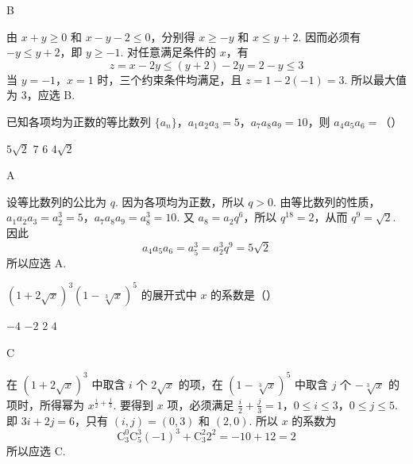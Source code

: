 \begin{answer}
B
\end{answer}

\begin{solution}
由 \(x+y\geqslant0\) 和 \(x-y-2\leqslant0\)，分别得 \(x\geqslant-y\) 和 \(x\leqslant y+2\). 因而必须有 \(-y\leqslant y+2\)，即 \(y\geqslant-1\). 对任意满足条件的 \(x\)，有
\[
z=x-2y\leqslant(y+2)-2y=2-y\leqslant3
\]
当 \(y=-1\)，\(x=1\) 时，三个约束条件均满足，且 \(z=1-2(-1)=3\). 所以最大值为 \(3\)，应选 B.
\end{solution}

\begin{problem}
已知各项均为正数的等比数列 \(\{a_{n}\}\)，\(a_{1}a_{2}a_{3} = 5\)，\(a_{7}a_{8}a_{9} = 10\)，则 \(a_{4}a_{5}a_{6} =\)（\quad）

\choices
    {\(5\sqrt{2}\)}
    {\(7\)}
    {\(6\)}
    {\(4\sqrt{2}\)}
\end{problem}

\begin{answer}
A
\end{answer}

\begin{solution}
设等比数列的公比为 \(q\). 因为各项均为正数，所以 \(q>0\). 由等比数列的性质，
\(a_{1}a_{2}a_{3}=a_{2}^{3}=5\)，\(a_{7}a_{8}a_{9}=a_{8}^{3}=10\).
又 \(a_{8}=a_{2}q^{6}\)，所以 \(q^{18}=2\)，从而 \(q^{9}=\sqrt2\). 因此
\[
a_{4}a_{5}a_{6}=a_{5}^{3}=a_{2}^{3}q^{9}=5\sqrt2
\]
所以应选 A.
\end{solution}

\begin{problem}
\((1 + 2\sqrt{x})^3 (1 - \sqrt[3]{x})^5\) 的展开式中 \(x\) 的系数是（\quad）

\choices
    {\(-4\)}
    {\(-2\)}
    {\(2\)}
    {\(4\)}
\end{problem}

\begin{answer}
C
\end{answer}

\begin{solution}
在 \((1+2\sqrt{x})^{3}\) 中取含 \(i\) 个 \(2\sqrt{x}\) 的项，在
\((1-\sqrt[3]{x})^{5}\) 中取含 \(j\) 个 \(-\sqrt[3]{x}\) 的项时，所得幂为
\(x^{\frac{i}{2}+\frac{j}{3}}\). 要得到 \(x\) 项，必须满足
\(\frac{i}{2}+\frac{j}{3}=1\)，\(0\leqslant i\leqslant3\)，\(0\leqslant j\leqslant5\).
即 \(3i+2j=6\)，只有 \((i,j)=(0,3)\) 和 \((2,0)\). 所以 \(x\) 的系数为
\[
\mathrm C_{3}^{0}\mathrm C_{5}^{3}(-1)^{3}+\mathrm C_{3}^{2}2^{2}=-10+12=2
\]
所以应选 C.
\end{solution}

